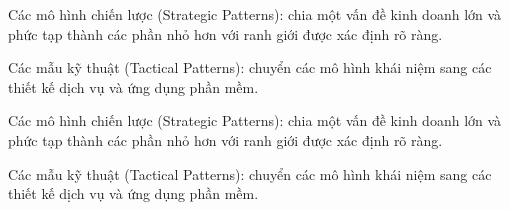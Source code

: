 
Các mô hình chiến lược (Strategic Patterns): chia một vấn đề kinh doanh lớn và phức tạp thành các phần nhỏ hơn với ranh giới được xác định rõ ràng.

Các mẫu kỹ thuật (Tactical Patterns): chuyển các mô hình khái niệm sang các thiết kế dịch vụ và ứng dụng phần mềm.







Các mô hình chiến lược (Strategic Patterns): chia một vấn đề kinh doanh lớn và phức tạp thành các phần nhỏ hơn với ranh giới được xác định rõ ràng.

Các mẫu kỹ thuật (Tactical Patterns): chuyển các mô hình khái niệm sang các thiết kế dịch vụ và ứng dụng phần mềm.

